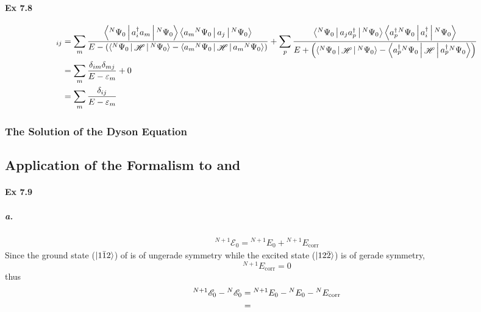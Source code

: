 \documentclass[a4paper]{article}
\DeclareMathOperator{\sH}{\mathscr{H}}
\DeclareMathOperator{\corr}{\mathrm{corr}}
\newcommand{\ex}[1]{\paragraph{Ex #1}}
\newcommand{\subex}[1]{\subparagraph{#1}}
\numberwithin{equation}{subsection}
\begin{document}
\ex{7.8}
\begin{align}
[\vb{G}_0(E)]_{ij} &= \sum_m 
\dfrac{\Braket{^N\Psi_0 | a_i^\dagger a_m | ^N\Psi_0} 
	\Braket{a_m {^N\Psi}_0| a_j | ^N\Psi_0}
}{E - \qty(\Braket{^N\Psi_0|\sH |^N\Psi_0} 
- \Braket{a_m {^N\Psi}_0|\sH|a_m {^N\Psi}_0} )}
+ \sum_p
\dfrac{\Braket{^N\Psi_0 | a_j a_p^\dagger | ^N\Psi_0} 
	\Braket{a_p^\dagger {^N\Psi}_0| a_i^\dagger | ^N\Psi_0}
}{E + \qty(\Braket{^N\Psi_0|\sH |^N\Psi_0} 
	- \Braket{a_p^\dagger {^N\Psi}_0|\sH|a_p^\dagger {^N\Psi}_0} )} \notag\\
&= \sum_m \dfrac{\delta_{im}\delta_{mj}}{E - \varepsilon_m} + 0 \notag\\
&= \sum_m \dfrac{\delta_{ij}}{E - \varepsilon_m}
\end{align}

\subsubsection{The Solution of the Dyson Equation}

\subsection{Application of the Formalism to  and }
\ex{7.9}
\subex{a.}
\begin{align}
^{N+1}\mathscr{E}_0 = {^{N+1}E_0} + {^{N+1}E_{\corr}}
\end{align}
Since the ground state ($ \ket{1\bar{1}2} $) of  is of ungerade symmetry while the excited state ($ \ket{12\bar{2}} $) is of gerade symmetry, 
\begin{equation}\label{key}
{^{N+1}E_{\corr}} = 0
\end{equation}
thus
\begin{align}
^{N+1}\mathscr{E}_0 - {^N}\mathscr{E}_0 &= {^{N+1}E_0} - {^{N}E_0} - {^N}E_{\corr} \notag\\
&=
\end{align}
\end{document}
